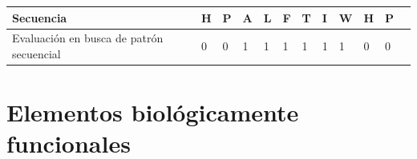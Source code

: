 \vspace{0.3cm}
\noindent
\begin{center}
\begin{tabular}{llllllllllll} 
\hline    
Secuencia & \textbf{H} & \textbf{P} & \textbf{A} & \textbf{L} & \textbf{F} & \textbf{T} & \textbf{I} & \textbf{W} & \textbf{H} &\textbf{P}  \\ \hline
Evaluación en busca de patrón secuencial & 0 & 0 & 1 & 1 & 1 & 1 & 1 & 1 & 0 & 0 \\ \hline
\end{tabular}
\end{center}







































































\section{Elementos biológicamente funcionales}\label{evaluacionFuncional}


